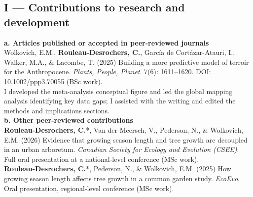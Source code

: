 \documentclass[12pt]{article}
\begin{document}
\subsection*{I --- Contributions to research and development}
\textbf{a. Articles published or accepted in peer-reviewed journals} \\[1pt]
Wolkovich, E.M., \textbf{Rouleau-Desrochers, C.}, García de Cortázar-Atauri, I., Walker, M.A., \& Lacombe, T. (2025) Building a more predictive model of terroir for the Anthropocene. \textit{Plants, People, Planet}. 7(6): 1611--1620. DOI: 10.1002/ppp3.70055 (BSc work). \\
I developed the meta-analysis conceptual figure and led the global mapping analysis identifying key data gaps; I assisted with the writing and edited the methods and implications sections. \\[1pt]

\textbf{b. Other peer-reviewed contributions} \\[1pt]
\textbf{Rouleau-Desrochers, C.}*, Van der Meersch, V., Pederson, N., \& Wolkovich, E.M. (2026) Evidence that growing season length and tree growth are decoupled in an urban arboretum. \textit{Canadian Society for Ecology and Evolution (CSEE)}. Full oral presentation at a national-level conference (MSc work). \\[1pt]

\textbf{Rouleau-Desrochers, C.}*, Pederson, N., \& Wolkovich, E.M. (2025) How growing season length affects tree growth in a common garden study. \textit{EcoEvo}. Oral presentation, regional-level conference (MSc work). \\[1pt]
\end{document}
